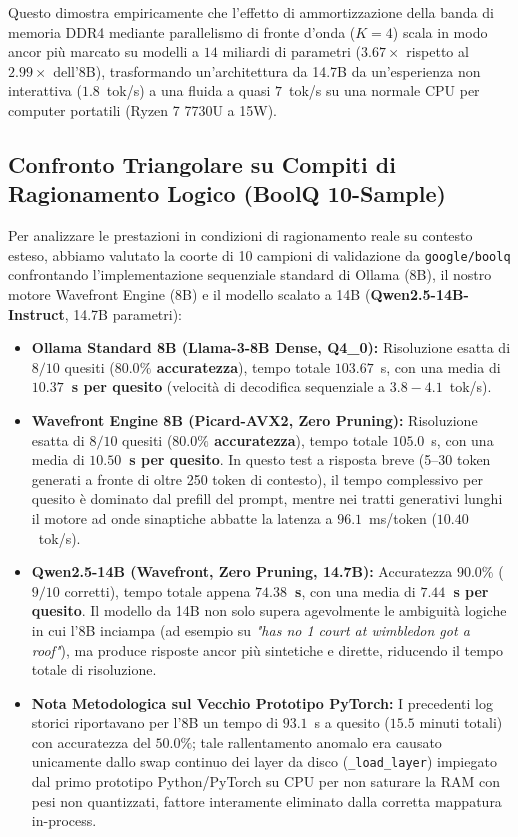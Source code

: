 \documentclass[10pt,a4paper]{article}
\theoremstyle{definition}
\begin{document}
Questo dimostra empiricamente che l'effetto di ammortizzazione della banda di memoria DDR4 mediante parallelismo di fronte d'onda ($K=4$) scala in modo ancor più marcato su modelli a $14$ miliardi di parametri ($3.67\times$ rispetto al $2.99\times$ dell'8B), trasformando un'architettura da 14.7B da un'esperienza non interattiva ($1.8$~tok/s) a una fluida a quasi $7$~tok/s su una normale CPU per computer portatili (Ryzen 7 7730U a 15W).

\subsection{Confronto Triangolare su Compiti di Ragionamento Logico (BoolQ 10-Sample)}
Per analizzare le prestazioni in condizioni di ragionamento reale su contesto esteso, abbiamo valutato la coorte di 10 campioni di validazione da \texttt{google/boolq} confrontando l'implementazione sequenziale standard di Ollama (8B), il nostro motore Wavefront Engine (8B) e il modello scalato a 14B (\textbf{Qwen2.5-14B-Instruct}, 14.7B parametri):

\begin{itemize}[leftmargin=1.5em]
    \item \textbf{Ollama Standard 8B (Llama-3-8B Dense, Q4\_0):} Risoluzione esatta di $8/10$ quesiti (\textbf{$80.0\%$ accuratezza}), tempo totale $103.67$~s, con una media di \textbf{$10.37$~s per quesito} (velocità di decodifica sequenziale a $3.8 - 4.1$~tok/s).
    \item \textbf{Wavefront Engine 8B (Picard-AVX2, Zero Pruning):} Risoluzione esatta di $8/10$ quesiti (\textbf{$80.0\%$ accuratezza}), tempo totale $105.0$~s, con una media di \textbf{$10.50$~s per quesito}. In questo test a risposta breve (5--30 token generati a fronte di oltre 250 token di contesto), il tempo complessivo per quesito è dominato dal prefill del prompt, mentre nei tratti generativi lunghi il motore ad onde sinaptiche abbatte la latenza a $96.1$~ms/token ($10.40$~tok/s).
    \item \textbf{Qwen2.5-14B (Wavefront, Zero Pruning, 14.7B):} Accuratezza \textbf{$90.0\%$} ($9/10$ corretti), tempo totale appena \textbf{$74.38$~s}, con una media di \textbf{$7.44$~s per quesito}. Il modello da 14B non solo supera agevolmente le ambiguità logiche in cui l'8B inciampa (ad esempio su \textit{"has no 1 court at wimbledon got a roof"}), ma produce risposte ancor più sintetiche e dirette, riducendo il tempo totale di risoluzione.
    \item \textbf{Nota Metodologica sul Vecchio Prototipo PyTorch:} I precedenti log storici riportavano per l'8B un tempo di $93.1$~s a quesito ($15.5$ minuti totali) con accuratezza del $50.0\%$; tale rallentamento anomalo era causato unicamente dallo swap continuo dei layer da disco (\texttt{\_load\_layer}) impiegato dal primo prototipo Python/PyTorch su CPU per non saturare la RAM con pesi non quantizzati, fattore interamente eliminato dalla corretta mappatura in-process.
\end{itemize}
\end{document}
